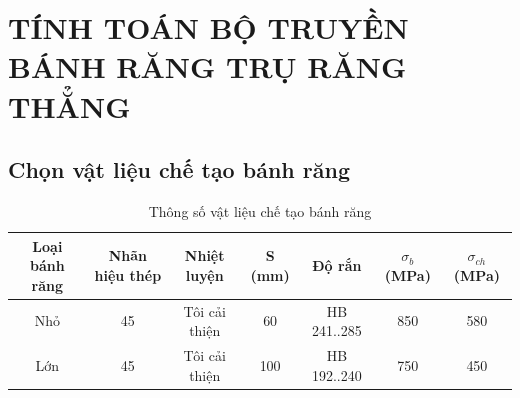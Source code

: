 \documentclass[12pt,a4paper]{report}
\begin{document}
\chapter{TÍNH TOÁN BỘ TRUYỀN BÁNH RĂNG TRỤ RĂNG THẲNG}

\section{Chọn vật liệu chế tạo bánh răng}
\begin{table}[H]
    \centering
    \caption{Thông số vật liệu chế tạo bánh răng}
    \label{tab:3.1}
    \begin{tabular}{|c|c|c|c|c|c|c|}
        \hline
        Loại bánh răng & Nhãn hiệu thép & Nhiệt luyện & S (mm) & Độ rắn & $\sigma_b$ (MPa) & $\sigma_{ch}$ (MPa) \\
        \hline
        Nhỏ & 45 & Tôi cải thiện & 60 & HB 241..285 & 850 & 580 \\
        Lớn & 45 & Tôi cải thiện & 100 & HB 192..240 & 750 & 450 \\
        \hline
    \end{tabular}
\end{table}
\end{document}
